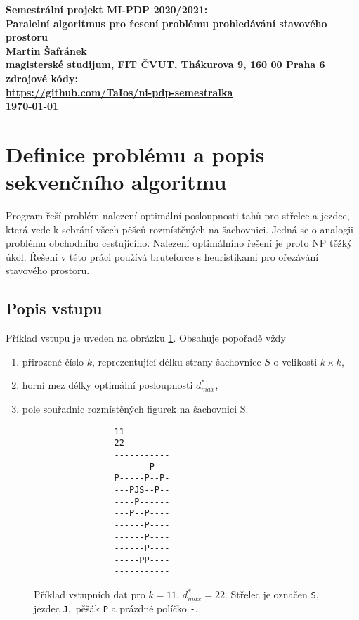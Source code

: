 \documentclass{article}
\begin{document}
    \begin{center}
        \bf Semestrální projekt MI-PDP 2020/2021:\\[5mm]
        Paralelní algoritmus pro řesení problému prohledávání stavového prostoru\\[5mm]
        Martin Šafránek\\[2mm]
        magisterské studijum, FIT ČVUT, Thákurova 9, 160 00 Praha 6\\[2mm]
        zdrojové kódy:\\ \url{https://github.com/TaIos/ni-pdp-semestralka}\\[2mm]
        \today
    \end{center}


    \label{sec:sequential}


    \section{Definice problému a popis sekvenčního algoritmu}

    Program řeší problém nalezení optimální posloupnosti tahů pro střelce a jezdce, která vede k sebrání
    všech pěšců rozmístěných na šachovnici. Jedná se o analogii problému obchodního cestujícího.
    Nalezení optimálního řešení je proto NP těžký úkol. Řešení v této práci používá bruteforce
    s heuristikami pro ořezávání stavového prostoru.
    \newline

    \label{subsec:popis-vstupu}

    \subsection{Popis vstupu}
    Příklad vstupu je uveden na obrázku \ref{fig:board-example}. Obsahuje popořadě vždy
    \begin{enumerate}
        \item přirozené číslo $k$, reprezentující délku strany šachovnice $S$ o velikosti $k \times k$,
        \item horní mez délky optimální posloupnosti $d^{*}_{max}$,
        \item pole souřadnic rozmístěných figurek na šachovnici S.
    \end{enumerate}

    \begin{figure}[h]
        \begin{center}
            \begin{BVerbatim}
                11
                22
                -----------
                -------P---
                P-----P--P-
                ---PJS--P--
                ----P------
                ---P--P----
                ------P----
                ------P----
                ------P----
                -----PP----
                -----------
            \end{BVerbatim}
        \end{center}
        \cprotect\caption{ Příklad vstupních dat pro $k=11$, $d^{*}_{max}=22$. Střelec je označen \verb|S|, jezdec \verb|J|,\
            pěšák \verb|P| a prázdné políčko \verb|-|. }
        \label{fig:board-example}
    \end{figure}
\end{document}

